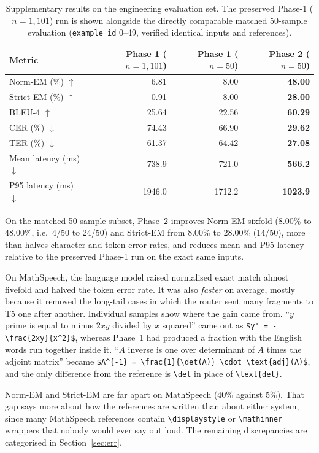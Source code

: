 \documentclass[11pt,a4paper,oneside]{report}
\theoremstyle{definition}
\newcommand{\code}[1]{\texttt{\small #1}}
\begin{document}
\begin{table}[ht]
\centering\small
\caption{Supplementary results on the engineering evaluation set. The preserved Phase-1 ($n=1{,}101$) run is shown alongside the directly comparable matched 50-sample evaluation (\code{example\_id} 0--49, verified identical inputs and references).}
\label{tab:manifest-accuracy}
\begin{tabular}{@{}lrrr@{}}
\toprule
\textbf{Metric} & \textbf{Phase 1 ($n=1{,}101$)} & \textbf{Phase 1 ($n=50$)} & \textbf{Phase 2 ($n=50$)} \\
\midrule
Norm-EM (\%) $\uparrow$ & 6.81 & 8.00 & \textbf{48.00} \\
Strict-EM (\%) $\uparrow$ & 0.91 & 8.00 & \textbf{28.00} \\
BLEU-4 $\uparrow$ & 25.64 & 22.56 & \textbf{60.29} \\
CER (\%) $\downarrow$ & 74.43 & 66.90 & \textbf{29.62} \\
TER (\%) $\downarrow$ & 61.37 & 64.42 & \textbf{27.08} \\
Mean latency (ms) $\downarrow$ & 738.9 & 721.0 & \textbf{566.2} \\
P95 latency (ms) $\downarrow$ & 1946.0 & 1712.2 & \textbf{1023.9} \\
\bottomrule
\end{tabular}
\end{table}

On the matched 50-sample subset, Phase~2 improves Norm-EM sixfold (8.00\% to 48.00\%, i.e.\ 4/50 to 24/50) and Strict-EM from 8.00\% to 28.00\% (14/50), more than halves character and token error rates, and reduces mean and P95 latency relative to the preserved Phase-1 run on the exact same inputs.

On MathSpeech, the language model raised normalised exact match almost fivefold and halved the token error rate. It was also \emph{faster} on average, mostly because it removed the long-tail cases in which the router sent many fragments to T5 one after another. Individual samples show where the gain came from. ``$y$ prime is equal to minus $2xy$ divided by $x$ squared'' came out as \verb|$y' = -\frac{2xy}{x^2}$|, whereas Phase~1 had produced a fraction with the English words run together inside it. ``$A$ inverse is one over determinant of $A$ times the adjoint matrix'' became \verb|$A^{-1} = \frac{1}{\det(A)} \cdot \text{adj}(A)$|, and the only difference from the reference is \verb|\det| in place of \verb|\text{det}|.

Norm-EM and Strict-EM are far apart on MathSpeech (40\% against 5\%). That gap says more about how the references are written than about either system, since many MathSpeech references contain \verb|\displaystyle| or \verb|\mathinner| wrappers that nobody would ever say out loud. The remaining discrepancies are categorised in Section~\ref{sec:err}.
\end{document}
